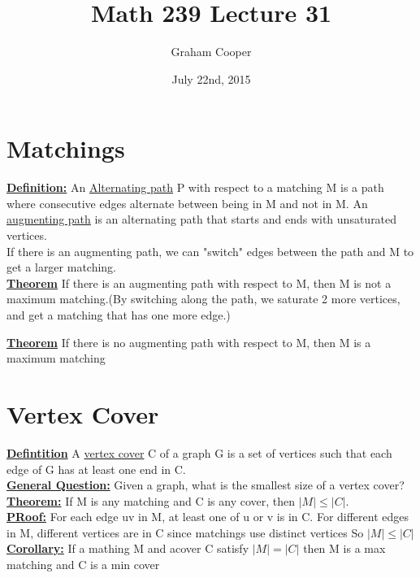 \documentclass[12pt]{article}
\title{\vspace{-15ex}Math 239 Lecture 31\vspace{-1ex}}
\date{July 22nd, 2015}
\author{Graham Cooper}
\newcommand{\myt}[1]{\textbf{\underline{#1}}}
\begin{document}
	\maketitle
	\section*{Matchings}
	\myt{Definition:} An \underline{Alternating path} P with respect to a matching M is a path where consecutive edges alternate between being in M and not in M. An \underline{augmenting path} is an alternating path that starts and ends with unsaturated vertices.\\
	
	If there is an augmenting path, we can "switch" edges between the path and M to get a larger matching.\\
	
	\myt{Theorem} If there is an augmenting path with respect to M, then M is not a maximum matching.(By switching along the path, we saturate 2 more vertices, and get a matching that has one more edge.)
	
	\myt{Theorem} If there is no augmenting path with respect to M, then M is a maximum matching\\
	
	\section*{Vertex Cover}
	
	\myt{Defintition} A \underline{vertex cover} C of a graph G is a set of vertices such that each edge of G has at least one end in C.\\
	
	\myt{General Question:} Given a graph, what is the smallest size of a vertex cover?\\
	
	\myt{Theorem:} If M is any matching and C is any cover, then $|M| \leq |C|$.\\
	
	\myt{PRoof:} For each edge uv in M, at least one of u or v is in C. For different edges in M, different vertices are in C since matchings use distinct vertices So $|M| \leq |C|$\\
	
	\myt{Corollary:} If a mathing M and acover C satisfy $|M| = |C|$ then M is a max matching and C is a min cover\\
	
	
	
	
\end{document}
